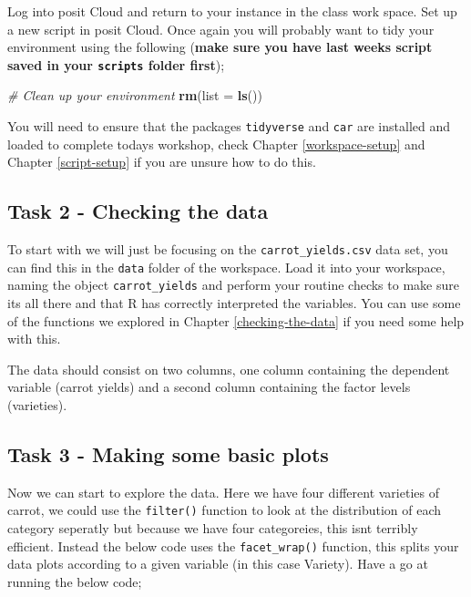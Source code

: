 \documentclass[
]{book}
\newenvironment{Shaded}{\begin{snugshade}}{\end{snugshade}}
\newcommand{\AttributeTok}[1]{\textcolor[rgb]{0.13,0.29,0.53}{#1}}
\newcommand{\CommentTok}[1]{\textcolor[rgb]{0.56,0.35,0.01}{\textit{#1}}}
\newcommand{\FunctionTok}[1]{\textcolor[rgb]{0.13,0.29,0.53}{\textbf{#1}}}
\newcommand{\NormalTok}[1]{#1}
\begin{document}
Log into posit Cloud and return to your instance in the class work space. Set up a new script in posit Cloud. Once again you will probably want to tidy your environment using the following (\textbf{make sure you have last weeks script saved in your \texttt{scripts} folder first});

\begin{Shaded}
\begin{Highlighting}[]
\CommentTok{\# Clean up your environment}
\FunctionTok{rm}\NormalTok{(}\AttributeTok{list =} \FunctionTok{ls}\NormalTok{())}
\end{Highlighting}
\end{Shaded}

You will need to ensure that the packages \texttt{tidyverse} and \texttt{car} are installed and loaded to complete todays workshop, check Chapter \ref{workspace-setup} and Chapter \ref{script-setup} if you are unsure how to do this.

\hypertarget{c5t2}{%
\subsection{Task 2 - Checking the data}\label{c5t2}}

To start with we will just be focusing on the \texttt{carrot\_yields.csv} data set, you can find this in the \texttt{data} folder of the workspace. Load it into your workspace, naming the object \texttt{carrot\_yields} and perform your routine checks to make sure its all there and that R has correctly interpreted the variables. You can use some of the functions we explored in Chapter \ref{checking-the-data} if you need some help with this.

The data should consist on two columns, one column containing the dependent variable (carrot yields) and a second column containing the factor levels (varieties).

\hypertarget{c5t3}{%
\subsection{Task 3 - Making some basic plots}\label{c5t3}}

Now we can start to explore the data. Here we have four different varieties of carrot, we could use the \texttt{filter()} function to look at the distribution of each category seperatly but because we have four categoreies, this isnt terribly efficient. Instead the below code uses the \texttt{facet\_wrap()} function, this splits your data plots according to a given variable (in this case Variety). Have a go at running the below code;
\end{document}
